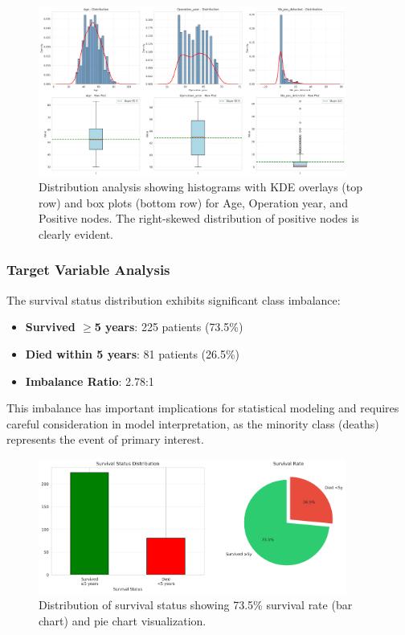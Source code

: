 \documentclass[12pt,a4paper]{article}
\begin{document}
\begin{figure}[H]
\centering
\includegraphics[width=0.9\textwidth]{univariate_distributions.png}
\caption{Distribution analysis showing histograms with KDE overlays (top row) and box plots (bottom row) for Age, Operation year, and Positive nodes. The right-skewed distribution of positive nodes is clearly evident.}
\label{fig:univariate_distributions}
\end{figure}

\subsubsection{Target Variable Analysis}

The survival status distribution exhibits significant class imbalance:

\begin{itemize}
    \item \textbf{Survived $\geq$5 years}: 225 patients (73.5\%)
    \item \textbf{Died within 5 years}: 81 patients (26.5\%)
    \item \textbf{Imbalance Ratio}: 2.78:1
\end{itemize}

This imbalance has important implications for statistical modeling and requires careful consideration in model interpretation, as the minority class (deaths) represents the event of primary interest.

\begin{figure}[H]
\centering
\includegraphics[width=0.9\textwidth]{survival_status_distribution.png}
\caption{Distribution of survival status showing 73.5\% survival rate (bar chart) and pie chart visualization.}
\label{fig:survival_distribution}
\end{figure}
\end{document}
